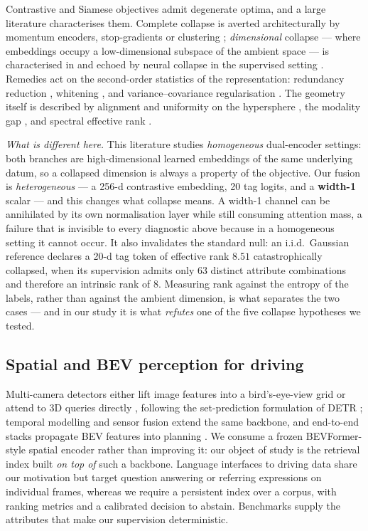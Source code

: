 \documentclass[10pt,twocolumn,letterpaper]{article}
\begin{document}
Contrastive and Siamese objectives admit degenerate optima, and a large
literature characterises them. Complete collapse is averted architecturally
by momentum encoders, stop-gradients or clustering
\cite{simclr,moco,byol,simsiam,swav,dino,dinov2}; \emph{dimensional} collapse ---
where embeddings occupy a low-dimensional subspace of the ambient space ---
is characterised in \cite{dimcollapse} and echoed by neural collapse in the
supervised setting \cite{neuralcollapse}. Remedies act on the second-order
statistics of the representation: redundancy reduction \cite{barlow},
whitening \cite{whitening}, and variance--covariance regularisation
\cite{vicreg}. The geometry itself is described by alignment and uniformity
on the hypersphere \cite{wangisola,contrastivebehaviour}, the modality gap
\cite{modalitygap}, and spectral effective rank \cite{erank}.

\noindent\emph{What is different here.} This literature studies
\emph{homogeneous} dual-encoder settings: both branches are
high-dimensional learned embeddings of the same underlying datum, so a
collapsed dimension is always a property of the objective. Our fusion is
\emph{heterogeneous} --- a 256-d contrastive embedding, 20 tag logits, and
a \textbf{width-1} scalar --- and this changes what collapse means. A
width-1 channel can be annihilated by its own normalisation layer while
still consuming attention mass, a failure that is invisible to every
diagnostic above because in a homogeneous setting it cannot occur. It also
invalidates the standard null: an i.i.d.\ Gaussian reference declares a
20-d tag token of effective rank $8.51$ catastrophically collapsed, when
its supervision admits only 63 distinct attribute combinations and
therefore an intrinsic rank of 8. Measuring rank against the entropy of the
labels, rather than against the ambient dimension, is what separates the
two cases --- and in our study it is what \emph{refutes} one of the five
collapse hypotheses we tested.

\subsection{Spatial and BEV perception for driving}
Multi-camera detectors either lift image features into a bird's-eye-view
grid \cite{lss,bevdepth} or attend to 3D queries directly
\cite{detr3d,petr,bevformer}, following the set-prediction formulation of
DETR \cite{detr,deformable}; temporal modelling
\cite{streampetr} and sensor fusion \cite{bevfusion} extend the same
backbone, and end-to-end stacks propagate BEV features into planning
\cite{uniad,vad}. We consume a frozen
BEVFormer-style spatial encoder \cite{bevformer} rather than improving it:
our object of study is the retrieval index built \emph{on top of} such a
backbone. Language interfaces to driving data
\cite{talk2car,nuprompt,drivelm,nuscenesqa,drivegpt4} share our motivation
but target question answering or referring expressions on individual
frames, whereas we require a persistent index over a corpus, with ranking
metrics and a calibrated decision to abstain. Benchmarks
\cite{nuscenes,waymo,av2} supply the attributes that make our supervision
deterministic.
\end{document}
